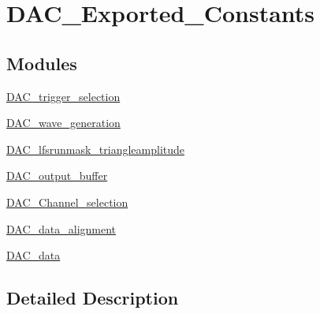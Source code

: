 \hypertarget{group___d_a_c___exported___constants}{}\section{D\+A\+C\+\_\+\+Exported\+\_\+\+Constants}
\label{group___d_a_c___exported___constants}
\subsection*{Modules}
\begin{DoxyCompactItemize}
\item 
\mbox{\hyperlink{group___d_a_c__trigger__selection}{D\+A\+C\+\_\+trigger\+\_\+selection}}
\item 
\mbox{\hyperlink{group___d_a_c__wave__generation}{D\+A\+C\+\_\+wave\+\_\+generation}}
\item 
\mbox{\hyperlink{group___d_a_c__lfsrunmask__triangleamplitude}{D\+A\+C\+\_\+lfsrunmask\+\_\+triangleamplitude}}
\item 
\mbox{\hyperlink{group___d_a_c__output__buffer}{D\+A\+C\+\_\+output\+\_\+buffer}}
\item 
\mbox{\hyperlink{group___d_a_c___channel__selection}{D\+A\+C\+\_\+\+Channel\+\_\+selection}}
\item 
\mbox{\hyperlink{group___d_a_c__data__alignment}{D\+A\+C\+\_\+data\+\_\+alignment}}
\item 
\mbox{\hyperlink{group___d_a_c__data}{D\+A\+C\+\_\+data}}
\end{DoxyCompactItemize}


\subsection{Detailed Description}
